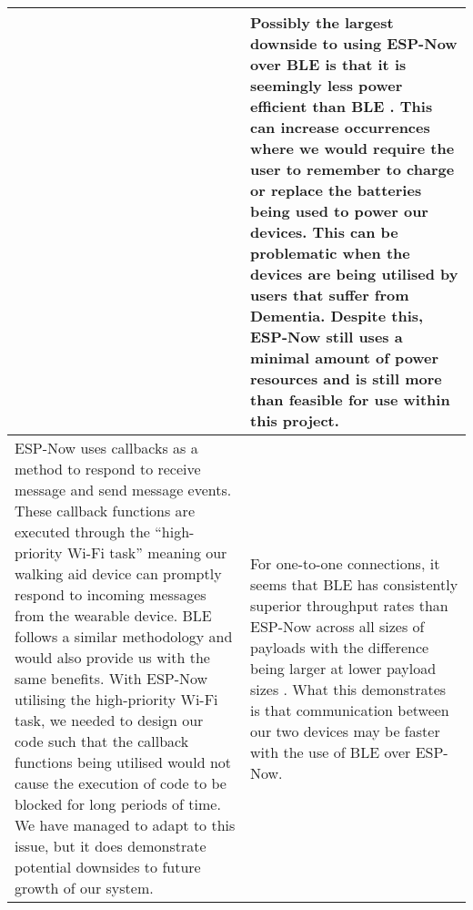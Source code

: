 \begin{xltabular}[H]{\textwidth}{p{0.47\textwidth} | p{0.47\textwidth}}
			
			&
			
			Possibly the largest downside to using ESP-Now over BLE is that it is seemingly less power efficient than BLE \cite{neupane_2019}. This can increase occurrences where we would require the user to remember to charge or replace the batteries being used to power our devices. This can be problematic when the devices are being utilised by users that suffer from Dementia. Despite this, ESP-Now still uses a minimal amount of power resources and is still more than feasible for use within this project.\\
			
			\midrule
			
			ESP-Now uses callbacks as a method to respond to receive message and send message events. These callback functions are executed through the ``high-priority Wi-Fi task'' \cite{esp-now_prog} meaning our walking aid device can promptly respond to incoming messages from the wearable device. BLE follows a similar methodology and would also provide us with the same benefits. With ESP-Now utilising the high-priority Wi-Fi task, we needed to design our code such that the callback functions being utilised would not cause the execution of code to be blocked for long periods of time. We have managed to adapt to this issue, but it does demonstrate potential downsides to future growth of our system.
			
			&
			
			For one-to-one connections, it seems that BLE has consistently superior throughput rates than ESP-Now across all sizes of payloads with the difference being larger at lower payload sizes \cite{neupane_2019}. What this demonstrates is that communication between our two devices may be faster with the use of BLE over ESP-Now.\\

		\end{xltabular} 
		\label{tbl:now}